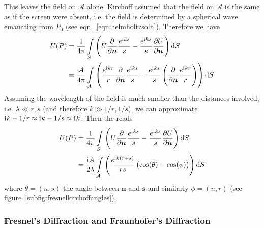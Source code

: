This leaves the field on \(\mathcal{A}\) alone.
%
Kirchoff assumed that the field on \(\mathcal{A}\) is the same as if the screen were absent, i.e. the field is determined by a spherical wave emanating from \(P_0\) (see eqn.~\eqref{eqn:helmholtzsoln}).
%
Therefore we have 
%
\begin{align}
    U(P) &= \frac{1}{4 \pi}\int\limits_{S} \left( U \pdv{}{\bm{n}} \frac{e^{\iu k s}}{s} - \frac{e^{\iu k s}}{s} \pdv{U}{\bm{n}} \right) \dif S  \\ 
    &= \frac{A}{4 \pi}\int\limits_{\mathcal{A}} \left( \frac{e^{\iu k r}}{r} \pdv{}{\bm{n}} \frac{e^{\iu k s}}{s} - \frac{e^{\iu k s}}{s} \left(\pdv{}{\bm{n}} \frac{e^{\iu k r}}{r}\right) \right) \dif S
\end{align}
%
Assuming the wavelength of the field is much smaller than the distances involved, i.e. \(\lambda \ll r, s\) (and therefore \(k \gg 1/r, 1/s\)), we can approximate \(\mathrm{i}\mkern1mu k - 1/r \approx \mathrm{i}\mkern1mu k - 1/s \approx \mathrm{i}\mkern1mu k\).
%
Then the  reads
\begin{align}
    U(P) &= \frac{1}{4 \pi}\int\limits_{S} \left( U \pdv{}{\bm{n}} \frac{e^{\iu k s}}{s} - \frac{e^{\iu k s}}{s} \pdv{U}{\bm{n}} \right) \dif S  \\ 
    &= \frac{\iu A}{2 \lambda}\int\limits_{\mathcal{A}}  \left( \frac{e^{\iu k (r+s)}}{r s} \left(\cos(\theta) - \cos(\phi) \right) \right) \dif S 
\end{align}
%
where \(\theta = (n, s)\) the angle between \(\bm{n}\) and \(\bm{s}\) and similarly \(\phi = (n, r)\) (see figure~\ref{subfig:fresnelkirchoffangles}).

\subsubsection{Fresnel’s Diffraction and Fraunhofer’s Diffraction}


